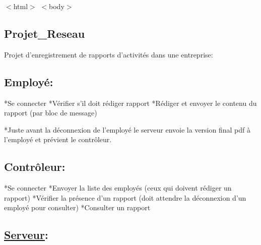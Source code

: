 $<$html$>$ $<$body$>$ 
\begin{DoxyPre}
\section*{Projet\_Reseau}\end{DoxyPre}



\begin{DoxyPre}
Projet d'enregistrement de rapports d'activités dans une entreprise:\end{DoxyPre}



\begin{DoxyPre}\subsection*{Employé:}\end{DoxyPre}



\begin{DoxyPre}
*Se connecter
*Vérifier s'il doit rédiger rapport
*Rédiger et envoyer le contenu du rapport (par bloc de message)\end{DoxyPre}



\begin{DoxyPre}*Juste avant la déconnexion de l'employé le serveur envoie la version final pdf
à l'employé et prévient le contrôleur.
\subsection*{Contrôleur:}\end{DoxyPre}



\begin{DoxyPre}
*Se connecter
*Envoyer la liste des employés (ceux qui doivent rédiger un rapport)
*Vérifier la présence d'un rapport (doit attendre la déconnexion d'un employé pour consulter)
*Consulter un rapport\end{DoxyPre}



\begin{DoxyPre}\subsection*{\hyperlink{class_serveur}{Serveur}:}\end{DoxyPre}



